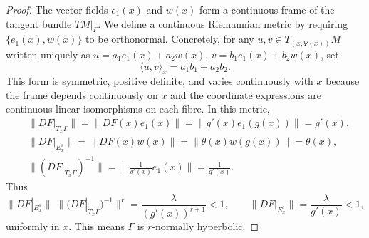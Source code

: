 \documentclass[10pt,a4paper]{amsart}
\begin{document}
\begin{proof}
		The vector fields $e_1(x)$ and $w(x)$ form a continuous frame of the tangent bundle
$TM|_\Gamma$.  We define a continuous
Riemannian metric by requiring $\{e_1(x), w(x)\}$ to be orthonormal.  Concretely, for
any $u,v\in T_{(x,\Psi(x))}M$ written uniquely as
$u = a_1 e_1(x) + a_2 w(x)$,\; $v = b_1 e_1(x) + b_2 w(x)$, set
\[
\langle u,v\rangle_x = a_1 b_1 + a_2 b_2.
\]
This form is symmetric, positive definite, and varies continuously with $x$ because the
frame depends continuously on $x$ and the coordinate expressions are continuous linear
isomorphisms on each fibre.  In this metric,
\begin{align*}
&\|DF|_{T_x\Gamma}\| = \|DF(x) e_1(x)\| = \|g'(x) e_1(g(x))\| = g'(x),\\
&\|DF|_{E^s_x}\| = \|DF(x) w(x)\| = \|\theta(x) w(g(x))\| = \theta(x),\\
&\|(DF|_{T_x\Gamma})^{-1}\| = \bigl\| \tfrac{1}{g'(x)} e_1(x) \bigr\| = \frac{1}{g'(x)}.
\end{align*}
		Thus
		\[
		\|DF|_{E^s_x}\|\;\bigl\|(DF|_{T_x\Gamma})^{-1}\bigr\|^r
		= \frac{\lambda}{(g'(x))^{r+1}} < 1,\qquad
		\|DF|_{E^s_x}\| = \frac{\lambda}{g'(x)} < 1,
		\]
		uniformly in $x$. This means $\Gamma$ is $r$-normally hyperbolic.
	\end{proof}
\end{document}
